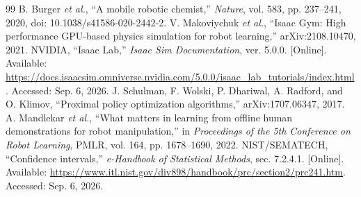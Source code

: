 \begin{thebibliography}{99}
 B. Burger \textit{et al.}, ``A mobile robotic chemist,'' \textit{Nature}, vol. 583, pp. 237--241, 2020, doi: 10.1038/s41586-020-2442-2.
 V. Makoviychuk \textit{et al.}, ``Isaac Gym: High performance GPU-based physics simulation for robot learning,'' arXiv:2108.10470, 2021.
 NVIDIA, ``Isaac Lab,'' \textit{Isaac Sim Documentation}, ver. 5.0.0. [Online]. Available: \url{https://docs.isaacsim.omniverse.nvidia.com/5.0.0/isaac_lab_tutorials/index.html}. Accessed: Sep. 6, 2026.
 J. Schulman, F. Wolski, P. Dhariwal, A. Radford, and O. Klimov, ``Proximal policy optimization algorithms,'' arXiv:1707.06347, 2017.
 A. Mandlekar \textit{et al.}, ``What matters in learning from offline human demonstrations for robot manipulation,'' in \textit{Proceedings of the 5th Conference on Robot Learning}, PMLR, vol. 164, pp. 1678--1690, 2022.
 NIST/SEMATECH, ``Confidence intervals,'' \textit{e-Handbook of Statistical Methods}, sec. 7.2.4.1. [Online]. Available: \url{https://www.itl.nist.gov/div898/handbook/prc/section2/prc241.htm}. Accessed: Sep. 6, 2026.
\end{thebibliography}
